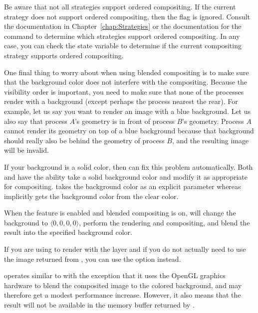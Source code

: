 Be aware that not all strategies support ordered compositing.  If the
current strategy does not support ordered compositing, then the
 flag is ignored.  Consult the
documentation in Chapter~\ref{chap:Strategies} or the documentation for the
 command to determine which strategies support ordered
compositing.  In any case, you can check the
 state variable to determine if
the current compositing strategy supports ordered compositing.



One final thing to worry about when using blended compositing is to make
sure that the background color does not interfere with the compositing.
Because the visibility order is important, you need to make sure that none
of the processes render with a background (except perhaps the process
nearest the rear).  For example, let us say you want to render an image
with a blue background.  Let us also say that process $A$'s geometry is in
front of process $B$'s geometry.  Process $A$ cannot render its geometry on
top of a blue background because that background should really also be
behind the geometry of process $B$, and the resulting image will be
invalid.

If your background is a solid color, then \IceT can fix this problem
automatically.  Both  and  have
the ability take a solid background color and modify it as appropriate for
compositing.   takes the background color as an
explicit parameter whereas  implicitly gets the
background color from the \OpenGL clear color.

When the  feature is enabled and
blended compositing is on, \IceT will change the background to $\langle 0,
0, 0, 0 \rangle$, perform the rendering and compositing, and blend the
result into the specified background color.

If you are using  to render with the \OpenGL layer
and if you do not actually need to use the image returned from
, you can use the
 option instead.

 operates similar to
 with the exception that it uses
the OpenGL graphics hardware to blend the composited image to the colored
background, and may therefore get a modest performance increase.  However,
it also means that the result will not be available in the memory buffer
returned by .

